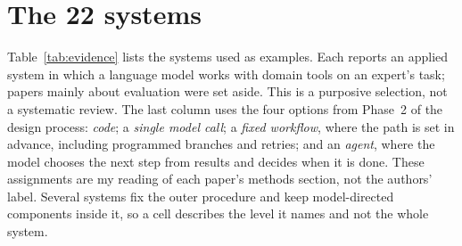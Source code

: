 \documentclass[10pt]{article}
\begin{document}
\appendix
\section{The 22 systems}

Table~\ref{tab:evidence} lists the systems used as examples.
Each reports an applied system in which a language model works with domain tools on an expert's task; papers mainly about evaluation were set aside. This is a purposive selection, not a systematic review.
The last column uses the four options from Phase~2 of the design process: \emph{code}; a \emph{single model call}; a \emph{fixed workflow}, where the path is set in advance, including programmed branches and retries; and an \emph{agent}, where the model chooses the next step from results and decides when it is done.
These assignments are my reading of each paper's methods section, not the authors' label. Several systems fix the outer procedure and keep model-directed components inside it, so a cell describes the level it names and not the whole system.
\end{document}
